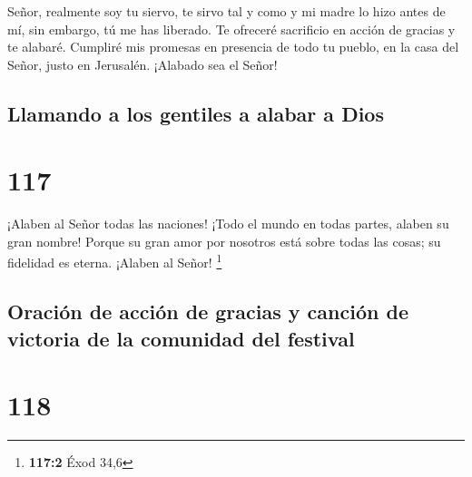  Señor, realmente soy tu siervo, te sirvo tal y como y mi
madre lo hizo antes de mí, sin embargo, tú me has liberado.
 Te ofreceré sacrificio en acción de gracias y te alabaré.
 Cumpliré mis promesas en presencia de todo tu pueblo,
 en la casa del Señor, justo en Jerusalén. ¡Alabado sea el
Señor!

\hypertarget{llamando-a-los-gentiles-a-alabar-a-dios}{%
\subsection{Llamando a los gentiles a alabar a
Dios}\label{llamando-a-los-gentiles-a-alabar-a-dios}}

\hypertarget{section-116}{%
\section{117}\label{section-116}}

 ¡Alaben al Señor todas las naciones! ¡Todo el mundo en
todas partes, alaben su gran nombre!  Porque su gran amor
por nosotros está sobre todas las cosas; su fidelidad es eterna. ¡Alaben
al Señor! \footnote{\textbf{117:2} Éxod 34,6}

\hypertarget{oraciuxf3n-de-acciuxf3n-de-gracias-y-canciuxf3n-de-victoria-de-la-comunidad-del-festival}{%
\subsection{Oración de acción de gracias y canción de victoria de la
comunidad del
festival}\label{oraciuxf3n-de-acciuxf3n-de-gracias-y-canciuxf3n-de-victoria-de-la-comunidad-del-festival}}

\hypertarget{section-117}{%
\section{118}\label{section-117}}

